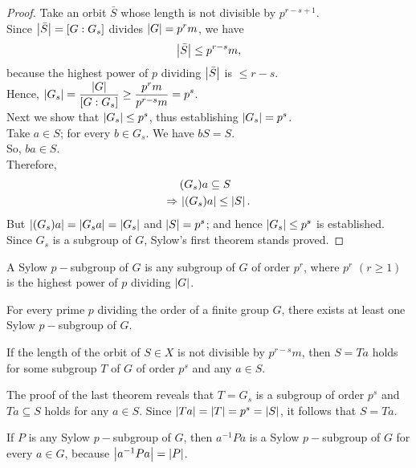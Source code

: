 \documentclass[../main-sheet.tex]{subfiles}
\begin{document}
\begin{proof}
        Take an orbit \(\bar{S}\) whose length is not divisible by \(p^{r-s+1}\).\\
        Since \(\left\vert\bar{S}\right\vert= [G : G_s]\) divides \(\left\vert G\right\vert = p^rm\), we have
        \[\left\vert\bar{S}\right\vert \leq p^{r-s}m,\]
        because the highest power of \(p\) dividing \(\left\vert\bar{S}\right\vert\) is \(\leq r -s\).\\
        Hence, \(\displaystyle\left\vert G_s\right\vert=\frac{\left\vert G\right\vert}{[G:G_s]}\geq \frac{p^rm}{p^{r-s}m}=p^s\).\\
        Next we show that \(\left\vert G_s\right\vert \leq p^s\), thus establishing \(\left\vert G_s\right\vert= p^s\).\\
        Take \(a \in S\); for every \(b \in G_s\). We have \(bS = S\).\\
        So, \(ba \in S\).\\
        Therefore,
        \begin{align*}
            &(G_s)a \subseteq S\\
            \Rightarrow\,&\left\vert(G_s)a\right\vert \leq \left\vert S\right\vert.
        \end{align*}
        But \(\left\vert(G_s)a\right\vert = \left\vert G_sa\right\vert = \left\vert G_s\right\vert\) and \(\left\vert S\right\vert = p^s\);
         and hence \(\left\vert G_s\right\vert \leq p^s\) is established.\\
        Since \(G_s\) is a subgroup of \(G\), Sylow's first theorem stands proved.
    \end{proof}
\begin{defn}
    A Sylow \(p-\)subgroup of \(G\) is any subgroup of \(G\) of order \(p^r\), where \(p^r\) \((r \geq 1)\) is the highest power of \(p\) dividing \(\left\vert G\right\vert\).
\end{defn}
\begin{cor}
For every prime \(p\) dividing the order of a finite group \(G\), there exists at
least one Sylow \(p-\)subgroup of \(G\).
\end{cor}
\begin{cor}\label{cor:10.5}
If the length of the orbit of \(S \in X\) is not divisible by \(p^{r-s}m\), then \(S=Ta\)
holds for some subgroup \(T\) of \(G\) of order \(p^s\) and any \(a \in S\).
\end{cor}
The proof of the last theorem reveals that \(T = G_s\) is a subgroup of order \(p^s\) and \(Ta\subseteq S\)
holds for any \(a \in S\). Since \(\left\vert Ta\right\vert=\left\vert T\right\vert=p^s=\left\vert S\right\vert\), it follows that \(S=Ta\).


If \(P\) is any Sylow \(p-\)subgroup of \(G \), then \(a^{-1}Pa\) is a Sylow \(p-\)subgroup of \(G\) for every
\(a \in G \), because \(\left\vert a^{-1} Pa\right\vert = \left\vert P\right\vert\).\\
\end{document}
